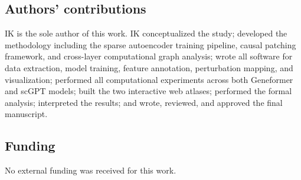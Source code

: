 \documentclass[onecolumn]{article}
\begin{document}
\subsection*{Authors' contributions}
IK is the sole author of this work. IK conceptualized the study; developed the methodology including the sparse autoencoder training pipeline, causal patching framework, and cross-layer computational graph analysis; wrote all software for data extraction, model training, feature annotation, perturbation mapping, and visualization; performed all computational experiments across both Geneformer and scGPT models; built the two interactive web atlases; performed the formal analysis; interpreted the results; and wrote, reviewed, and approved the final manuscript.

\subsection*{Funding}
No external funding was received for this work.
\end{document}
